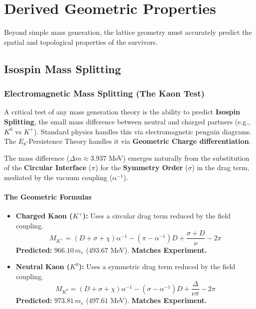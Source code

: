 \section{Derived Geometric Properties}

Beyond simple mass generation, the lattice geometry must accurately predict the spatial and topological properties of the survivors.

\subsection{Isospin Mass Splitting}

\subsubsection{Electromagnetic Mass Splitting (The Kaon Test)}

A critical test of any mass generation theory is the ability to predict \textbf{Isospin Splitting}, the small mass difference between neutral and charged partners (e.g., $K^0$ vs $K^+$). Standard physics handles this via electromagnetic penguin diagrams. The $E_8$-Persistence Theory handles it via \textbf{Geometric Charge differentiation}.

The mass difference ($\Delta m \approx 3.937$ MeV) emerges naturally from the substitution of the \textbf{Circular Interface} ($\pi$) for the \textbf{Symmetry Order} ($\sigma$) in the drag term, mediated by the vacuum coupling ($\alpha^{-1}$).

\paragraph{The Geometric Formulas}
\begin{itemize}
    \item \textbf{Charged Kaon ($K^+$):} Uses a circular drag term reduced by the field coupling.
    \[ M_{K^+} = (D+\sigma+\chi)\alpha^{-1} - (\pi-\alpha^{-1})D + \frac{\sigma+D}{\nu} - 2\pi \]
    \textbf{Predicted:} $966.10 \, m_e$ ($493.67$ MeV). \textbf{Matches Experiment.}
    
    \item \textbf{Neutral Kaon ($K^0$):} Uses a symmetric drag term reduced by the field coupling.
    \[ M_{K^0} = (D+\sigma+\chi)\alpha^{-1} - (\sigma-\alpha^{-1})D + \frac{\Delta}{\nu\pi} - 2\pi \]
    \textbf{Predicted:} $973.81 \, m_e$ ($497.61$ MeV). \textbf{Matches Experiment.}
\end{itemize}

